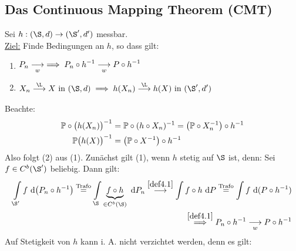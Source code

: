 \subsection*{Das Continuous Mapping Theorem (CMT)}
Sei $h:(\S,d)\to(\S',d')$ messbar.\\
\underline{Ziel:} Finde Bedingungen an $h$, so dass gilt:
\begin{enumerate}[label=(\arabic*)]
\item $\begin{aligned}
P_n\stackrelnew{w}{}{\longrightarrow}\implies P_n\circ h^{-1}\stackrelnew{w}{}{\longrightarrow} P\circ h^{-1}
\end{aligned}$
\item $\begin{aligned}
X_n\stackrel{\L}{\longrightarrow} X\text{ in }(\S,d)\implies h(X_n)\stackrel{\L}{\longrightarrow} h(X)\text{ in }(\S',d')
\end{aligned}$
\end{enumerate}
Beachte: 
\begin{align*}
\P\circ\big(h(X_n)\big)^{-1}&=\P\circ(h\circ X_n)^{-1}=\big(\P\circ X_n^{-1}\big)\circ h^{-1}\\
\P\big(h(X)\big)^{-1}&=\big(\P\circ X^{-1}\big)\circ h^{-1}
\end{align*}
Also folgt (2) aus (1). Zunächst gilt (1), wenn $h$ stetig auf $\S$  ist, denn: Sei $f\in C^b(\S')$ beliebig. Dann gilt:
\begin{align*}
\int\limits_{\S'} f\d \big(P_n\circ h^{-1}\big)
\stackeq{\text{Trafo}}
\int\limits_{\S} \underbrace{ f\circ h}_{\in C^b(\S)}\d P_n
\stackrel{\ref{def4.1}}{\longrightarrow}\int\limits f\circ h\d P
\stackeq{\text{Trafo}}
\int\limits f\d(P\circ h^{-1})\\
\stackrel{\ref{def4.1}}{\implies}
P_n\circ h^{-1}\stackrelnew{w}{}{\longrightarrow} P\circ h^{-1}
\end{align*}
Auf Stetigkeit von $h$ kann i. A. nicht verzichtet werden, denn es gilt:

